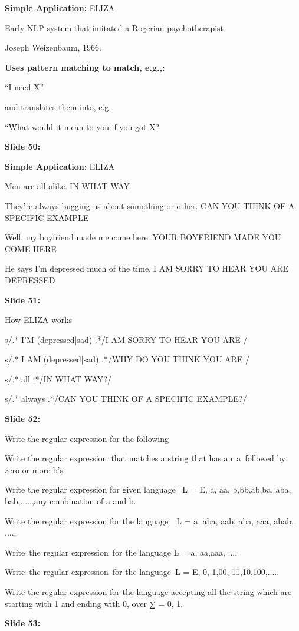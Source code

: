 \documentclass[11pt,a4paper]{article}
\begin{document}
\textbf{Simple Application:}  ELIZA

Early NLP system that imitated a Rogerian psychotherapist

Joseph Weizenbaum, 1966.

\textbf{Uses pattern matching to match, e.g.,:} 

“I need X”

and translates them into, e.g.

“What would it mean to you if you got X?

\textbf{Slide 50:}

\textbf{Simple Application:}  ELIZA

Men are all alike.IN WHAT WAY

They're always bugging us about something or other. CAN YOU THINK OF A SPECIFIC EXAMPLE

Well, my boyfriend made me come here.YOUR BOYFRIEND MADE YOU COME HERE

He says I'm depressed much of the time.I AM SORRY TO HEAR YOU ARE DEPRESSED

\textbf{Slide 51:}

How ELIZA works

s/.* I’M (depressed|sad) .*/I AM SORRY TO HEAR YOU ARE \1/

s/.* I AM (depressed|sad) .*/WHY DO YOU THINK YOU ARE \1/

s/.* all .*/IN WHAT WAY?/

s/.* always .*/CAN YOU THINK OF A SPECIFIC EXAMPLE?/

\textbf{Slide 52:}

Write the regular expression for the following

Write the regular expression that matches a string that has an a followed by zero or more b's

Write the regular expression for given language  L = {E, a, aa, b,bb,ab,ba, aba, bab,.....},any combination of a and b.

Write the regular expression for the language  L = {a, aba, aab, aba, aaa, abab, .....}

Write the regular expression for the language L = {a, aa,aaa, ....}

Write the regular expression for the language L = {E, 0, 1,00, 11,10,100,.....}

Write the regular expression for the language accepting all the string which are starting with 1 and ending with 0, over ∑ = {0, 1}.

\textbf{Slide 53:}
\end{document}
